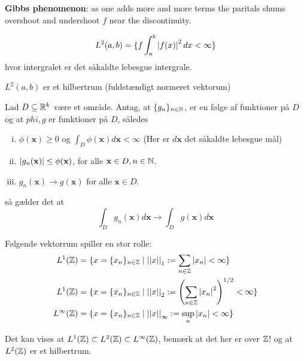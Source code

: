 \begin{definition}
\textbf{Gibbs phenomenon}: as one adds more and more terms the paritals shums overshoot and undershoot $f$ near the discontinuity.
\end{definition}

\begin{definition}
\begin{equation*}
  L^{2}(a, b) = \{f \int_a^b \left|f(x)\right|^{2} dx < \infty\}
\end{equation*}
hvor intergralet er det såkaldte lebesgue intergrale.
\end{definition}
\begin{theorem}
$L^{2}(a, b)$ er et hilbertrum (fuldstændigt normeret vektorum)
\end{theorem}

\begin{theorem}
Lad $D \subseteq \mathbb{R}^{k}$ være et område. Antag, at $\{g_{n}\}_{n \in \mathbb{N}}$, er en følge af funktioner på $D$ og at $phi, g$ er funktioner på $D$, således
\begin{enumerate}[i)]
  \item $\phi(\mathbf{x}) \geq 0$ og $\int_{D} \phi(\mathbf{x}) d \mathbf{x} < \infty$ (Her er $d \mathbf{x}$ det såkaldte lebesgue mål)
  \item $\left|g_{n}(\mathbf{x})\right| \leq \phi(\mathbf{x})$, for alle $\mathbf{x} \in D, n \in \mathbb{N}$.
  \item $g_{n}(\mathbf{x}) \to g(\mathbf{x})$ for alle $\mathbf{x} \in D$.
\end{enumerate}
så gælder det at
\begin{equation*}
  \int_{D} g_{n}(\mathbf{x}) d \mathbf{x} \to \int_{D} g(\mathbf{x}) d \mathbf{x}
\end{equation*}
\end{theorem}

\begin{definition}
  Følgende vektorrum spiller en stor rolle:
  \begin{align*}
    L^{1}(\mathbb{Z}) &= \{x = \{x_{n}\}_{n \in \mathbb{Z}} \mid \left|\left|x\right|\right|_{1} := \sum_{n\in \mathbb{Z}} \left|x_{n}\right| < \infty \}\\
    L^{1}(\mathbb{Z}) &= \{x = \{x_{n}\}_{n \in \mathbb{Z}} \mid \left|\left|x\right|\right|_{2} := \left(\sum_{n\in \mathbb{Z}} \left|x_{n}\right|^{2}\right)^{1/2} < \infty \}\\
    L^{\infty}(\mathbb{Z}) &= \{x = \{x_{n}\}_{n \in \mathbb{Z}} \mid \left|\left|x\right|\right|_{\infty} := \sup_{n} \left|x_{n}\right| < \infty \}
  \end{align*}
\end{definition}
\begin{remark}
  Det kan vises at $L^{1}(\mathbb{Z}) \subset L^{2}(\mathbb{Z}) \subset L^{\infty}(\mathbb{Z})$, bemærk at det her er over $\mathbb{Z}$! og at $L^{2}(\mathbb{Z})$ er et hilbertrum.
\end{remark}

